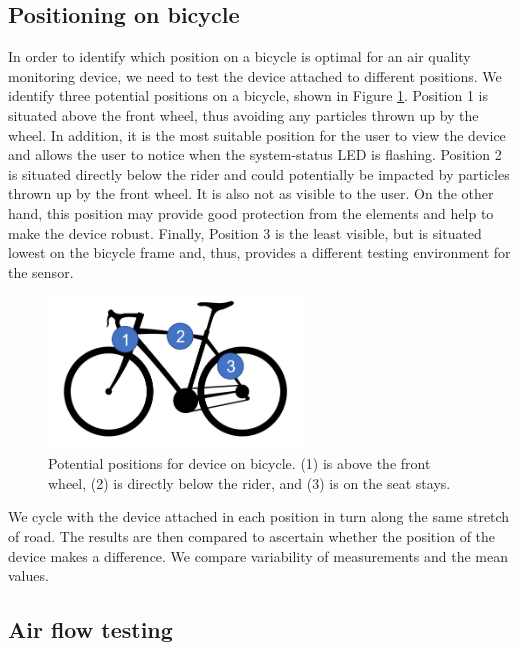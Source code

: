 \documentclass[11pt]{report}
\begin{document}
\subsection{Positioning on bicycle} \label{position_testing}

In order to identify which position on a bicycle is optimal for an air quality monitoring device, we need to test the device attached to different positions. We identify three potential positions on a bicycle, shown in Figure \ref{bicycle_positions}. Position 1 is situated above the front wheel, thus avoiding any particles thrown up by the wheel. In addition, it is the most suitable position for the user to view the device and allows the user to notice when the system-status LED is flashing. Position 2 is situated directly below the rider and could potentially be impacted by particles thrown up by the front wheel. It is also not as visible to the user. On the other hand, this position may provide good protection from the elements and help to make the device robust. Finally, Position 3 is the least visible, but is situated lowest on the bicycle frame and, thus, provides a different testing environment for the sensor.

\begin{figure}[!tb]
\centering
\includegraphics[width=0.6\textwidth]{images/bicycle_positions}
\caption{Potential positions for device on bicycle. (1) is above the front wheel, (2) is directly below the rider, and (3) is on the seat stays.}
\label{bicycle_positions}
\end{figure}

We cycle with the device attached in each position in turn along the same stretch of road. The results are then compared to ascertain whether the position of the device makes a difference. We compare variability of measurements and the mean values.


\subsection{Air flow testing}
\end{document}
